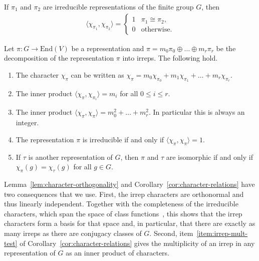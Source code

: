 \begin{lemma} \label{lem:character-orthogonality}
    If $\pi_1$ and $\pi_2$ are irreducible representations of the finite group $G$, then 
    \begin{align}
        \langle \chi_{\pi_1}, \chi_{\pi_2}\rangle = \begin{cases}
            1 & \pi_1 \cong \pi_2, \\
            0 & \text{otherwise}.
        \end{cases}
    \end{align}
\end{lemma}

\begin{cor} \label{cor:character-relations}
    Let $\pi : G \to \mathrm{End}(V)$ be a representation and $\pi = m_0 \pi_0 \oplus \dots \oplus m_r \pi_r$ be the decomposition of the representation $\pi$ into irreps. The following hold.
    \begin{enumerate}
        \item The character $\chi_{\pi}$ can be written as $\chi_{\pi} = m_0 \chi_{\pi_0} + m_1 \chi_{\pi_1} + \dots + m_r \chi_{\pi_r}$.
        \item \label{item:irrep-mult-test} The inner product $\langle \chi_{\pi}, \chi_{\pi_i}\rangle = m_i$ for all $0 \leq i \leq r$.
        \item The inner product $\langle \chi_{\pi}, \chi_{\pi} \rangle = m_0^2 + \dots + m_r^2$. In particular this is always an integer.
        \item The representation $\pi$ is irreducible if and only if $\langle \chi_{\pi}, \chi_{\pi} \rangle = 1$.
        \item If $\tau$ is another representation of $G$, then $\pi$ and $\tau$ are isomorphic if and only if $\chi_{\pi}(g) = \chi_{\tau}(g)$ for all $g \in G$.
    \end{enumerate}
\end{cor}

Lemma~\ref{lem:character-orthogonality} and Corollary~\ref{cor:character-relations} have two consequences that we use.
First, the irrep characters are orthonormal and thus linearly independent.
Together with the completeness of the irreducible characters, which span the space of class functions~\cite{sagan2001symmetric}, this shows that the irrep characters form a basis for that space and, in particular, that there are exactly as many irreps as there are conjugacy classes of $G$.
Second, item~\ref{item:irrep-mult-test} of Corollary~\ref{cor:character-relations} gives the multiplicity of an irrep in any representation of $G$ as an inner product of characters.

